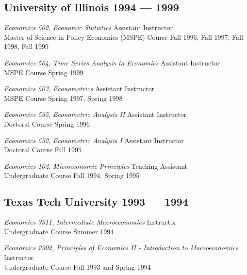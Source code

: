 \subsection{{University of Illinois \hfill 1994 --- 1999}}
\begin{zitemize}
\item \textit{Economics 502, Economic Statistics} \hfill  Assistant Instructor \\
Master of Science in Policy Economics (MSPE) Course \hfill Fall 1996, Fall 1997, Fall 1998, Fall 1999
\vspace{0.2ex}
\item \textit{Economics 504, Time Series Analysis in Economics} \hfill Assistant Instructor \\ 
MSPE Course \hfill Spring 1999
\vspace{0.2em}
\item \textit{Economics 503, Econometrics} \hfill Assistant Instructor \\
MSPE Course \hfill Spring 1997, Spring 1998	
\vspace{0.2em}
\item \textit{Economics 535, Econometric Analysis II} \hfill Assistant Instructor \\
Doctoral Course \hfill Spring 1996
\vspace{0.2em}
\item \textit{Economics 532, Econometric Analysis I} \hfill Assistant Instructor \\
Doctoral Course \hfill Fall 1995
\vspace{0.2em}
\item \textit{Economics 102, Microeconomic Principles} \hfill Teaching Assistant \\
Undergraduate Course \hfill Fall 1994, Spring 1995 
\end{zitemize}


\subsection{{Texas Tech University \hfill 1993 --- 1994}}
\begin{zitemize}
\item \textit{Economics 3311, Intermediate Macroeconomics} \hfill Instructor \\
Undergraduate Course \hfill Summer 1994
\vspace{0.2em}
\item \textit{Economics 2302, Principles of Economics II - Introduction to Macroeconomics} \hfill Instructor \\
Undergraduate Course \hfill Fall 1993 and Spring 1994
\end{zitemize}

